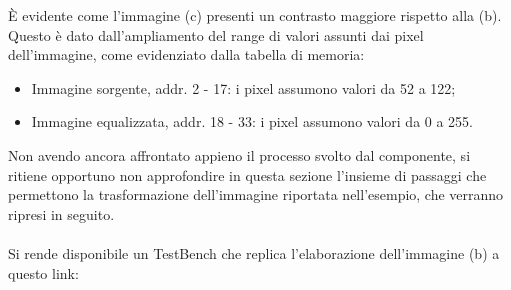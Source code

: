\documentclass{article}
\begin{document}
\vspace{0.3cm}

È evidente come l'immagine \small (c) \normalsize presenti un contrasto maggiore rispetto alla \small(b)\normalsize. Questo è dato dall'ampliamento del range di valori assunti dai pixel dell'immagine, come evidenziato dalla tabella di memoria:
\begin{itemize}
    \item Immagine sorgente, addr. 2 - 17: i pixel assumono valori da 52 a 122;
    \item Immagine equalizzata, addr. 18 - 33: i pixel assumono valori da 0 a 255.
\end{itemize}

Non avendo ancora affrontato appieno il processo svolto dal componente, si ritiene opportuno non approfondire in questa sezione 
l'insieme di passaggi che permettono la trasformazione dell'immagine riportata nell'esempio, che verranno ripresi in seguito. 
\\\\
Si rende disponibile un TestBench che replica l'elaborazione dell'immagine \small (b) \normalsize a questo link:\\
\end{document}
